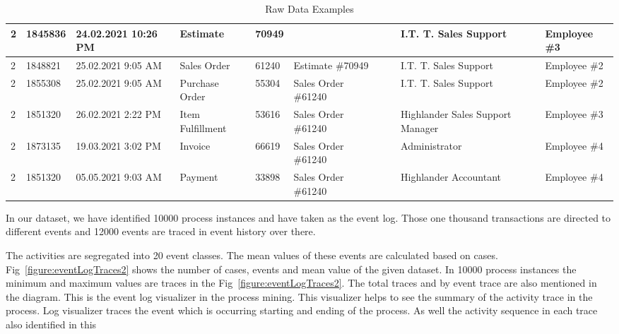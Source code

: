 \begin{table}[htb]
\scriptsize %
\begin{tabularx}{\textwidth}{|X|X|X|X|X|X|X|X|X|X|}
\hline
2&1845836 & 24.02.2021 10:26 PM & Estimate & 70949 &	
 &	 &	& I.T. T. Sales Support &	Employee \#3 \\
\hline
2&1848821 & 25.02.2021 9:05 AM & Sales Order  & 61240 &	Estimate \#70949
 &	 &	& I.T. T. Sales Support &	Employee \#2 \\
\hline
2&1855308 & 25.02.2021 9:05 AM & Purchase Order  & 55304 &	Sales Order \#61240
 &	 &	& I.T. T. Sales Support &	Employee \#2 \\
\hline
2&1851320 & 26.02.2021 2:22 PM & Item Fulfillment  & 53616 &	Sales Order \#61240
 &	 &	& Highlander Sales Support Manager &	Employee \#3 \\
\hline
2&1873135 & 19.03.2021 3:02 PM & Invoice  & 66619 &	Sales Order \#61240
 &	 &	& Administrator &	Employee \#4 \\
\hline
2&1851320 & 05.05.2021 9:03 AM & Payment  & 33898 &	Sales Order \#61240
 &	 &	& Highlander Accountant
 &	Employee \#4 \\
\hline
\end{tabularx}
\caption{Raw Data Examples}
\label{table:datapreprocessed-case2}
\end{table}


In our dataset, we have identified 10000 process instances and have taken as the event log. Those one thousand transactions are directed to different events and 12000 events are traced in event history over there. 

The activities are segregated into 20 event classes. 
The mean values of these events are calculated based on cases. Fig~\ref{figure:eventLogTraces2} shows the number of cases, events and mean value of the given dataset. In 10000 process instances the minimum and maximum values are traces in the Fig~\ref{figure:eventLogTraces2}. The total traces and by event trace are also mentioned in the diagram. This is the event log visualizer in the process mining. This visualizer helps to see the summary of the activity trace in the process. Log visualizer traces the event which is occurring starting and ending of the process. As well the activity sequence in each trace also identified in this




